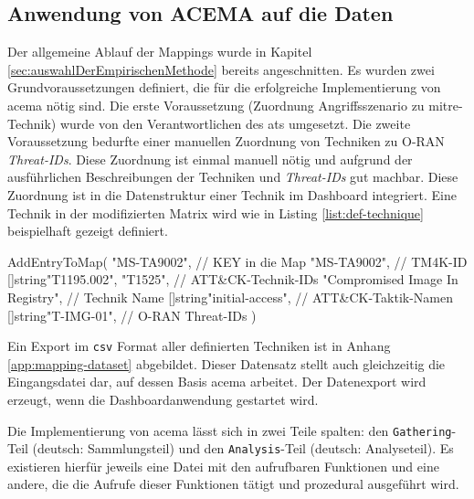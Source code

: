 \subsection{Anwendung von ACEMA auf die Daten}
\label{sec:impl-anwendungVonAcema}
Der allgemeine Ablauf der Mappings wurde in Kapitel \ref{sec:auswahlDerEmpirischenMethode} bereits angeschnitten. Es wurden zwei Grundvoraussetzungen definiert, die für die erfolgreiche Implementierung von \gls{acema} nötig sind. Die erste Voraussetzung (Zuordnung Angriffsszenario zu \gls{mitre}-Technik) wurde von den Verantwortlichen des \glspl{at} umgesetzt. Die zweite Voraussetzung bedurfte einer manuellen Zuordnung von Techniken zu O-RAN \textit{Threat-IDs}. Diese Zuordnung ist einmal manuell nötig und aufgrund der ausführlichen Beschreibungen der Techniken und \textit{Threat-IDs} gut machbar. Diese Zuordnung ist in die Datenstruktur einer Technik im Dashboard integriert. Eine Technik in der modifizierten Matrix wird wie in Listing \ref{list:def-technique} beispielhaft gezeigt definiert.
\begin{code}[caption=Beispielhafte Definition einer Technik im Dashboard, label={list:def-technique}]
    AddEntryToMap(
        "MS-TA9002",                        // KEY in die Map
        "MS-TA9002",                        // TM4K-ID
        []string{"T1195.002", "T1525"},     // ATT&CK-Technik-IDs
        "Compromised Image In Registry",    // Technik Name
        []string{"initial-access"},         // ATT&CK-Taktik-Namen
        []string{"T-IMG-01"},               // O-RAN Threat-IDs
    )
\end{code}

Ein Export im \verb|csv| Format aller definierten Techniken ist in Anhang \ref{app:mapping-dataset} abgebildet. Dieser Datensatz stellt auch gleichzeitig die Eingangsdatei dar, auf dessen Basis \gls{acema} arbeitet. Der Datenexport wird erzeugt, wenn die Dashboardanwendung gestartet wird.
\par Die Implementierung von \gls{acema} lässt sich in zwei Teile spalten: den \verb|Gathering|-Teil (deutsch: Sammlungsteil) und den \verb|Analysis|-Teil (deutsch: Analyseteil). Es existieren hierfür jeweils eine Datei mit den aufrufbaren Funktionen und eine andere, die die Aufrufe dieser Funktionen tätigt und prozedural ausgeführt wird.

